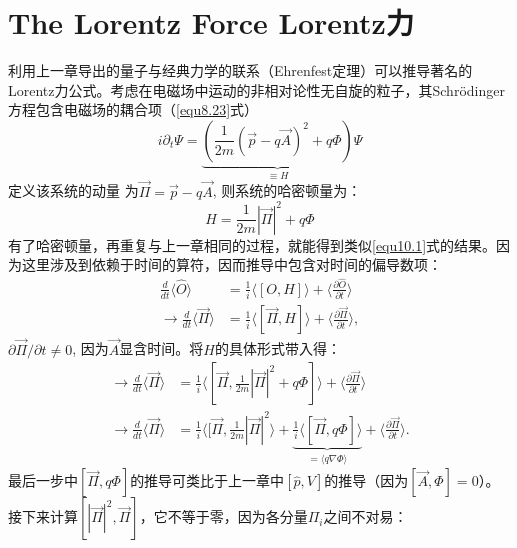 \section[Lorentz力]{The Lorentz Force \quad Lorentz力}
\label{sec11.2}
利用上一章导出的量子与经典力学的联系（Ehrenfest定理）可以推导著名的Lorentz力公式。考虑在电磁场中运动的非相对论性无自旋的粒子，其Schr\"{o}dinger方程包含电磁场的耦合项（\ref{equ8.23}式）%
\begin{equation}
\label{equ11.18}
    i \partial_t \Psi = \underbrace{ \left( \frac{1}{2m} (\vec{p} - q\vec{A})^2 + q \Phi \right)}_{\equiv H} \Psi
\end{equation}
定义该系统的动量%
%
为$\vec{\Pi} = \vec{p} - q \vec{A}$, 则系统的哈密顿量为：
\begin{equation*}
    H = \frac{1}{2m} |\vec{\Pi}|^2 + q \Phi
\end{equation*}
有了哈密顿量，再重复与上一章相同的过程，就能得到类似\ref{equ10.1}式的结果。因为这里涉及到依赖于时间的算符，因而推导中包含对时间的偏导数项：
\begin{align*}
    \frac{d}{dt} \langle \hat{O} \rangle &= \frac{1}{i} \langle [O, H] \rangle + \langle \frac{\partial \hat{O}}{\partial t} \rangle \\
    \to \frac{d}{dt} \langle \vec{\Pi} \rangle &= \frac{1}{i} \langle [\vec{\Pi}, H] \rangle + \langle \frac{\partial \vec{\Pi}}{\partial t} \rangle,
\end{align*}
$\partial \vec{\Pi} / \partial t \neq 0$, 因为$\vec{A}$显含时间。将$H$的具体形式带入得：
\begin{align*}
    \to \frac{d}{dt} \langle \vec{\Pi} \rangle &= \frac{1}{i} \langle [\vec{\Pi}, \frac{1}{2m} |\vec{\Pi}|^2 + q \Phi] \rangle + \langle \frac{\partial \vec{\Pi}}{\partial t} \rangle \\
    \to \frac{d}{dt} \langle \vec{\Pi} \rangle &= \frac{1}{i} \langle [\vec{\Pi}, \frac{1}{2m} |\vec{\Pi}|^2 \rangle + \underbrace{ \frac{1}{i} \langle [\vec{\Pi}, q\Phi] \rangle }_{ = \langle q \nabla \Phi \rangle } + \langle \frac{\partial \vec{\Pi}}{\partial t} \rangle .
\end{align*}
最后一步中$[\vec{\Pi}, q\Phi]$的推导可类比于上一章中$[\hat{p}, V]$的推导（因为$[\vec{A}, \Phi] = 0$）。接下来计算$[|\vec{\Pi}|^2, \vec{\Pi}]$，它不等于零，因为各分量$\Pi_i$之间不对易：
